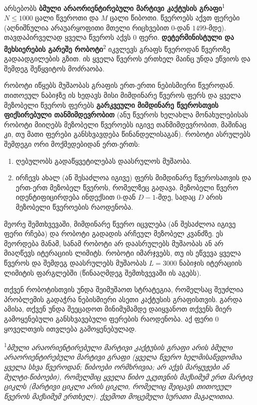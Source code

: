 \documentclass[12pt]{article}
\begin{document}
\renewcommand{\round}{Day 2}
\renewcommand{\problemName}{ამოცანა ნავიგაცია}
\renewcommand{\lang}{ქართული}

\renewcommand{\tl}{$3$ sec.}
\renewcommand{\ml}{$512$ MB}
\problem{\problemName}

არსებობს \textbf{ბმული არაორიენტირებული მარტივი კაქტუსის გრაფი}\textsuperscript{1} $N \leq 1000$ ცალი წვეროთი და $M$ ცალი წიბოთი. წვეროებს აქვთ ფერები (აღნიშნულია არაუარყოფითი მთელი რიცხვებით $0$-დან $1499$-მდე). თავდაპირველად ყველა წვეროს აქვს $0$ ფერი. \textbf{დეტერმინისტული და მეხსიერების გარეშე რობოტი}\textsuperscript{2} იკვლევს გრაფს წვეროდან წვეროზე გადაადგილების გზით. ის ყველა წვეროს ერთხელ მაინც უნდა ეწვიოს და შემდეგ შეწყვიტოს მოძრაობა.

რობოტი იწყებს მუშაობას გრაფის ერთ-ერთი ნებისმიერი წვეროდან. თითოეულ ნაბიჯზე ის ხედავს მისი მიმდინარე წვეროს ფერს და ყველა მეზობელი წვეროს ფერებს \textbf{გარკვეული მიმდინარე წვეროსთვის ფიქსირებული თანმიმდევრობით} (ანუ წვეროს ხელახლა მონახულებისას რობოტი მიიღებს მეზობელი წვეროებს იგივე თანმიმდევრობით, მაშინაც კი, თუ მათი ფერები განსხვავდება წინანდელისაგან). რობოტი ასრულებს შემდეგი ორი მოქმედებიდან ერთ-ერთს:
\begin{enumerate}
\item ღებულობს გადაწყვეტილებას დაასრულოს მუშაობა.
\item ირჩევს ახალ (ან შესაძლოა იგივე) ფერს მიმდინარე წვეროსათვის და ერთ-ერთ მეზობელ წვეროს, რომელზეც გადავა. მეზობელი წვერო  იდენტიფიცირდება ინდექსით $0$-დან $D-1$-მდე, სადაც $D$ არის მეზობელი წვეროების რაოდენობა.
\end{enumerate}

მეორე შემთხვევაში, მიმდინარე წვერო იცვლება (ან შესაძლოა იგივე ფერი რჩება) და რობოტი გადადის არჩეულ მეზობელ კვანძზე. ეს მეორდება მანამ, სანამ რობოტი არ დაასრულებს  მუშაობას ან არ მიაღწევს იტერაციის ლიმიტს. რობოტი იმარჯვებს, თუ ის ეწვევა ყველა წვეროს და შემდეგ დაასრულებს  მუშაობას $L = 3000$ ნაბიჯის იტერაციის ლიმიტის ფარგლებში (წინააღმდეგ შემთხვევაში ის აგებს).

თქვენ რობოტისთვის უნდა შეიმუშაოთ სტრატეგია, რომელსაც შეუძლია პრობლემის გადაჭრა ნებისმიერი ასეთი კაქტუსის გრაფისთვის. გარდა ამისა, თქვენ უნდა შეეცადოთ მინიმუმამდე დაიყვანოთ თქვენს მიერ გამოყენებული განსხვავებული ფერების რაოდენობა. აქ ფერი 0 ყოველთვის ითვლება გამოყენებულად.

\textsuperscript{1}\textit{ბმული არაორიენტირებული მარტივი კაქტუსის გრაფი არის ბმული არაორიენტირებული მარტივი გრაფი (ყველა წვერო ხელმისაწვდომია ყველა სხვა წვეროდან; წიბოები ორმხრივია; არ აქვს მარყუჟები ან მულტი-წიბოები), რომელშიც ყველა წიბო ეკუთვნის მაქსიმუმ ერთ მარტივ ციკლს (მარტივი ციკლი არის ციკლი, რომელიც შეიცავს თითოეულ წვეროს მაქსიმუმ ერთხელ). ქვემოთ მოცემული სურათი მაგალითია.}
\end{document}
